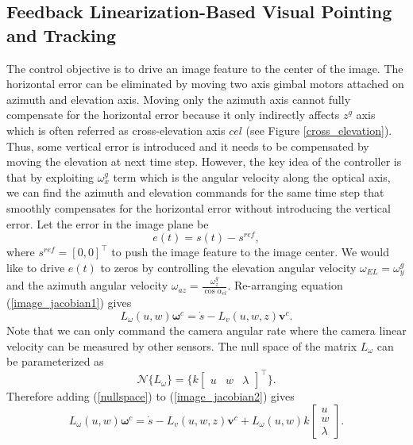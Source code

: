 \subsection{Feedback Linearization-Based Visual Pointing and Tracking}
The control objective is to drive an image feature to the center of the image. The horizontal error can be eliminated by moving two axis gimbal motors attached on azimuth and elevation axis. Moving only the azimuth axis cannot fully compensate for the horizontal error because it only indirectly affects $z^g$ axis which is often referred as cross-elevation axis $cel$ (see Figure \ref{cross_elevation}). Thus, some vertical error is introduced and it needs to be compensated by moving the elevation at next time step. However, the key idea of the controller is that by exploiting $\omega_x^g$ term which is the angular velocity along the optical axis, we can find the azimuth and elevation commands for the same time step that smoothly compensates for the horizontal error without introducing the vertical error. Let the error in the image plane be
\begin{equation}
e(t)=s(t)-s^{ref},
\label{image_feature_error}
\end{equation}
where $s^{ref}=[0, 0]^\top$ to push the image feature to the image center. We would like to drive $e(t)$ to zeros by controlling the elevation angular velocity $\omega_{EL}=\omega_y^g$ and the azimuth angular velocity $\omega_{az}=\frac{\omega_z^g}{\cos \alpha_{el}}$. Re-arranging equation (\ref{image_jacobian1}) gives
\begin{equation}
L_{\omega}(u,w)\mathbf{\omega}^c=\dot{s}-L_v(u,w,z)\mathbf{v}^c.
\label{image_jacobian2}
\end{equation}
Note that we can only command the camera angular rate where the camera linear velocity can be measured by other sensors. The null space of the matrix $L_{\omega}$ can be parameterized as
\begin{equation}
\mathcal{N}\{L_{\omega}\}=\{k\begin{bmatrix}
u & w & \lambda
\end{bmatrix}^\top\}.
\label{nullspace}
\end{equation}
Therefore adding (\ref{nullspace}) to (\ref{image_jacobian2}) gives
\begin{equation}
L_{\omega}(u,w)\mathbf{\omega}^c=\dot{s}-L_v(u,w,z)\mathbf{v}^c+L_{\omega}(u,w)k\begin{bmatrix}
u \\ w \\ \lambda
\end{bmatrix}.
\label{image_jacobian3}
\end{equation}
